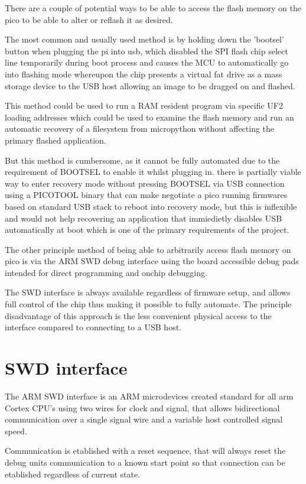 There are a couple of potential ways to be able to access the flash memory on the pico to be able to alter or reflash it as desired.

The most common and usually used method is by holding down the 'bootsel' button when plugging the pi into usb, which disabled the SPI flash chip select line temporarily during boot process and causes the MCU to automatically go into flashing mode whereupon the chip presents a virtual fat drive as a mass storage device to the USB host allowing an image to be dragged on and flashed.

This method could be used to run a RAM resident program via specific UF2 loading addresses which could be used to examine the flash memory and run an automatic recovery of a filesystem from micropython without affecting the primary flashed application.

But this method is cumbersome, as it cannot be fully automated due to the requirement of BOOTSEL to enable it whilst plugging in. there is partially viable way to enter recovery mode without pressing BOOTSEL via USB connection using a PICOTOOL binary that can make negotiate a pico running firmwares based on standard USB stack to reboot into recovery mode, but this is inflexible and would not help recovering an application that immiedietly disables USB automatically at boot which is one of the primary requirements of the project.

The other principle method of being able to arbitrarily access flash memory on pico is via the ARM SWD debug interface using the board accessible debug pads intended for direct programming and onchip debugging.

The SWD interface  is always available regardless of firmware setup, and allows full control of the chip thus making it possible to fully automate. The principle disadvantage of this approach is the less convenient physical access to the interface compared to connecting to a USB host.
\pagebreak
\section{SWD interface}
The ARM SWD interface is an ARM microdevices created standard for all arm Cortex CPU's using two wires for clock and signal, that allows bidirectional communication over a single signal wire and a variable host controlled signal speed.

Communication is etablished with a reset sequence, that will always reset the debug units communication to a known start point so that connection can be etablished regardless of current state.

